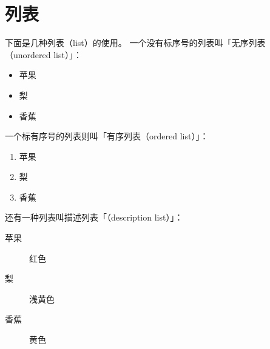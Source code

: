 
\section{列表}

下面是几种列表（list）的使用。
一个没有标序号的列表叫「无序列表（unordered list）」：
\begin{itemize}
\item
    苹果
\item
    梨
\item
    香蕉
\end{itemize}
一个标有序号的列表则叫「有序列表（ordered list）」：
\begin{enumerate}
\item
    苹果
\item
    梨
\item
    香蕉
\end{enumerate}
还有一种列表叫描述列表「（description list）」：
\begin{description}
\item[苹果]
    红色
\item[梨]
    浅黄色
\item[香蕉]
    黄色
\end{description}

